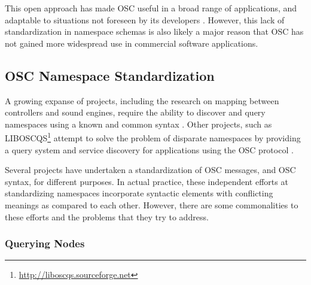 \documentclass{NIME-alternate}
\begin{document}
This open approach has made OSC useful in a broad range of applications, and adaptable to situations not foreseen by its developers \cite{Wright:2005}.  However, this lack of standardization in namespace schemas is also likely a major reason that OSC has not gained more widespread use in commercial software applications.



\subsection{OSC Namespace Standardization} %
\label{sub:namespace_standardization}

A growing expanse of projects, including the research on mapping between controllers and sound engines, require the ability to discover and query namespaces using a known and common syntax \cite{Malloch:2007}. Other projects, such as LIBOSCQS\footnote{\url{http://liboscqs.sourceforge.net}} attempt to solve the problem of disparate namespaces by providing a query system and service discovery for applications using the OSC protocol \cite{Habets:2005, Schmeder:2004oscqs}.



Several projects have undertaken a standardization of OSC messages, and OSC syntax, for different purposes. In actual practice, these independent efforts at standardizing namespaces incorporate syntactic elements with conflicting meanings as compared to each other. However, there are some commonalities to these efforts and the problems that they try to address.

\subsubsection{Querying Nodes}
\label{ssub:querying_nodes}
\end{document}
